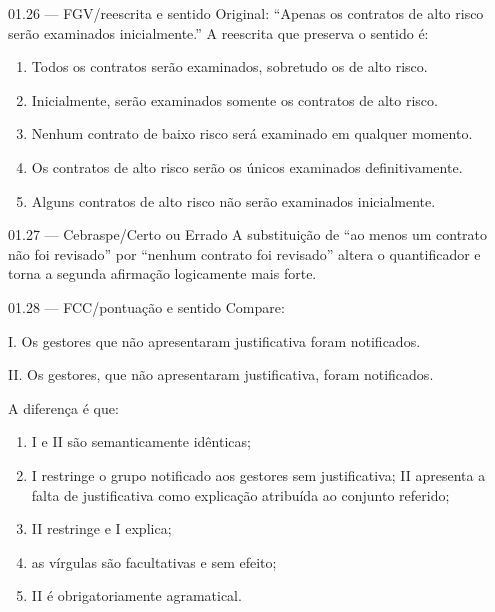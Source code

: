 \begin{questao}{ 01.26 — FGV/reescrita e sentido}
Original: ``Apenas os contratos de alto risco serão examinados inicialmente.'' A reescrita que preserva o sentido é:
\begin{enumerate}[label=\Alph*)]
\item Todos os contratos serão examinados, sobretudo os de alto risco.
\item Inicialmente, serão examinados somente os contratos de alto risco.
\item Nenhum contrato de baixo risco será examinado em qualquer momento.
\item Os contratos de alto risco serão os únicos examinados definitivamente.
\item Alguns contratos de alto risco não serão examinados inicialmente.
\end{enumerate}
\end{questao}

\begin{questao}{ 01.27 — Cebraspe/Certo ou Errado}
A substituição de ``ao menos um contrato não foi revisado'' por ``nenhum contrato foi revisado'' altera o quantificador e torna a segunda afirmação logicamente mais forte.
\end{questao}

\begin{questao}{ 01.28 — FCC/pontuação e sentido}
Compare:

I. Os gestores que não apresentaram justificativa foram notificados.

II. Os gestores, que não apresentaram justificativa, foram notificados.

A diferença é que:
\begin{enumerate}[label=\Alph*)]
\item I e II são semanticamente idênticas;
\item I restringe o grupo notificado aos gestores sem justificativa; II apresenta a falta de justificativa como explicação atribuída ao conjunto referido;
\item II restringe e I explica;
\item as vírgulas são facultativas e sem efeito;
\item II é obrigatoriamente agramatical.
\end{enumerate}
\end{questao}

